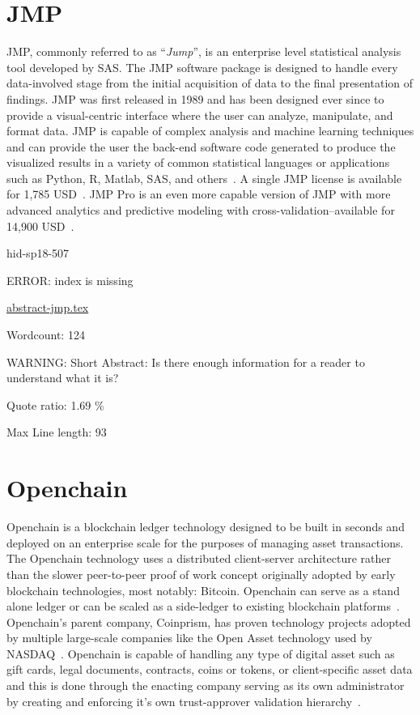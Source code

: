 \section{JMP}

JMP, commonly referred to as \color{blue}``\emph{Jump}''\color{black}, is an enterprise level
statistical analysis tool developed by SAS. The JMP software package
is designed to handle every data-involved stage from the initial
acquisition of data to the final presentation of findings. JMP was
first released in 1989 and has been designed ever since to provide a
visual-centric interface where the user can analyze, manipulate, and
format data. JMP is capable of complex analysis and machine learning
techniques and can provide the user the back-end software code
generated to produce the visualized results in a variety of common
statistical languages or applications such as Python, R, Matlab, SAS,
and others~\cite{hid-sp18-507-JMP9}. A single JMP license is available
for 1,785 USD~\cite{hid-sp18-507-JMPSAS}. JMP Pro is an even more
capable version of JMP with more advanced analytics and predictive
modeling with cross-validation--available for 14,900
USD~\cite{hid-sp18-507-JMPPro}.


\begin{IU}

hid-sp18-507

ERROR: index is missing

\href{https://github.com/cloudmesh-community/hid-sp18-507/blob/master//technology/abstract-jmp.tex}{abstract-jmp.tex}

 

Wordcount: 124

WARNING: Short Abstract: Is there enough information for a reader to understand what it is?


Quote ratio: 1.69 \%
 
Max Line length: 93
\end{IU}

\section{Openchain}

Openchain is a blockchain ledger technology designed to be built in
seconds and deployed on an enterprise scale for the purposes of
managing asset transactions. The Openchain technology uses a
distributed client-server architecture rather than the slower
peer-to-peer proof of work concept originally adopted by early
blockchain technologies, most notably: Bitcoin. Openchain can serve as
a stand alone ledger or can be scaled as a side-ledger to existing
blockchain platforms~\cite{hid-sp18-507-Openchain}. Openchain's parent
company, Coinprism, has proven technology projects adopted by multiple
large-scale companies like the Open Asset technology used by
NASDAQ~\cite{hid-sp18-507-BitcoinNews}. Openchain is capable of
handling any type of digital asset such as gift cards, legal
documents, contracts, coins or tokens, or client-specific asset data
and this is done through the enacting company serving as its own
administrator by creating and enforcing it's own trust-approver
validation hierarchy~\cite{hid-sp18-507-Coindesk}.


